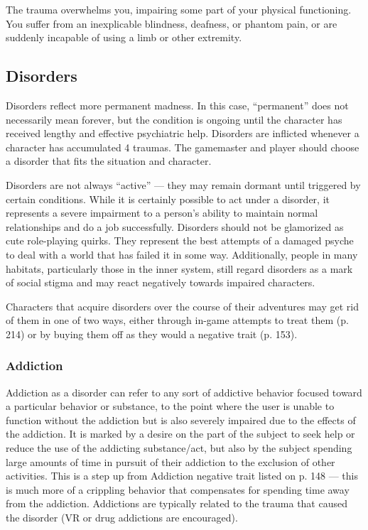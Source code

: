 The trauma overwhelms you, impairing some part of your physical functioning. You suffer from an inexplicable blindness, deafness, or phantom pain, or are suddenly incapable of using a limb or other extremity. 



\subsection{Disorders} \label{sec:disorders} 

Disorders reflect more permanent madness. In this case, ``permanent” does not necessarily mean forever, but the condition is ongoing until the character has received lengthy and effective psychiatric help. Disorders are inflicted whenever a character has accumulated 4 traumas. The gamemaster and player should choose a disorder that fits the situation and character. 

Disorders are not always ``active'' --- they may remain dormant until triggered by certain conditions. While it is certainly possible to act under a disorder, it represents a severe impairment to a person’s ability to maintain normal relationships and do a job successfully. Disorders should not be glamorized as cute role-playing quirks. They represent the best attempts of a damaged psyche to deal with a world that has failed it in some way. Additionally, people in many habitats, particularly those in the inner system, still regard disorders as a mark of social stigma and may react negatively towards impaired characters. 

Characters that acquire disorders over the course of their adventures may get rid of them in one of two ways, either through in-game attempts to treat them (p. 214) or by buying them off as they would a negative trait (p. 153). 

\subsubsection{Addiction} 

Addiction as a disorder can refer to any sort of addictive behavior focused toward a particular behavior or substance, to the point where the user is unable to function without the addiction but is also severely impaired due to the effects of the addiction. It is marked by a desire on the part of the subject to seek help or reduce the use of the addicting substance/act, but also by the subject spending large amounts of time in pursuit of their addiction to the exclusion of other activities. This is a step up from Addiction negative trait listed on p. 148 --- this is much more of a crippling behavior that compensates for spending time away from the addiction. Addictions are typically related to the trauma that caused the disorder (VR or drug addictions are encouraged). 

